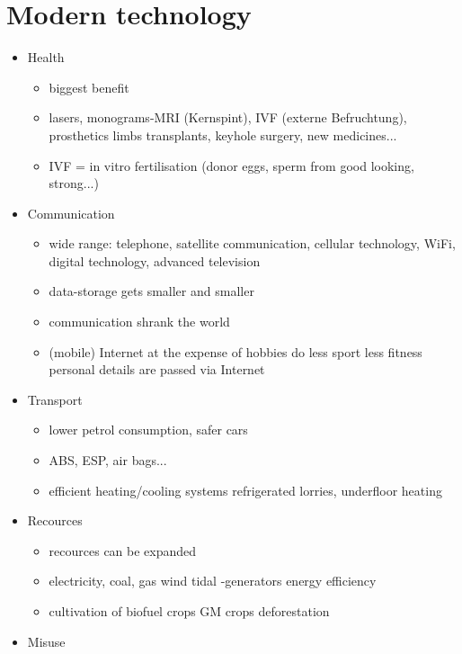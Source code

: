 \documentclass[a5paper,12pt,twoside,titlepage]{scrartcl}
\begin{document}
\section{Modern technology}
	\begin{itemize}
	\item Health
		\begin{itemize}
			\item biggest benefit
			\item lasers, monograms-MRI (Kernspint), IVF (externe Befruchtung), prosthetics limbs transplants, keyhole surgery, new medicines... 
			\item IVF = in vitro fertilisation (\textrightarrow donor eggs, sperm from good looking, strong...)
		\end{itemize}
	\item Communication
		\begin{itemize}
			\item wide range: telephone, satellite communication, cellular technology, WiFi, digital technology, advanced television
			\item data-storage gets smaller and smaller
			\item communication shrank the world
			\item (mobile) Internet at the expense of hobbies \textrightarrow do less sport \textrightarrow less fitness \textrightarrow personal details are passed via Internet
		\end{itemize}
	\item Transport
		\begin{itemize}
			\item lower petrol consumption, safer cars
			\item ABS, ESP, air bags...
			\item efficient heating/cooling systems \textrightarrow refrigerated lorries, underfloor heating
		\end{itemize}
	\item Recources
		\begin{itemize}
				\item recources can be expanded
				\item electricity, coal, gas \textrightarrow wind tidal -generators \textrightarrow energy efficiency
				\item cultivation of biofuel crops \textrightarrow GM crops \textrightarrow deforestation
		\end{itemize}
	\item Misuse
		\begin{itemize}

\end{itemize}
\end{itemize}
\end{document}
